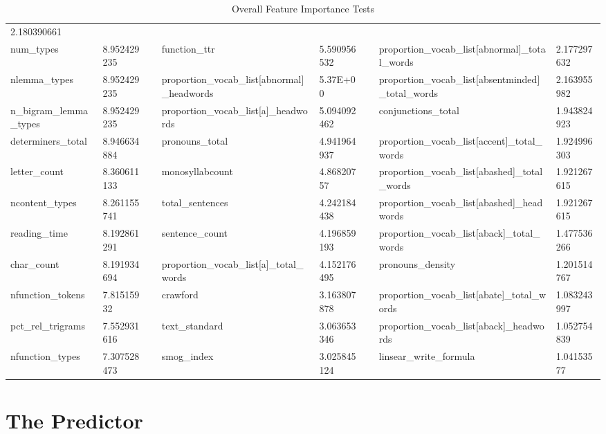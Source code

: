 \begin{table}[h]
{\begin{tabular}{@{}llllllll@{}}
  2.180390661 \\
num\_types &
  8.952429235 &
  &
  function\_ttr &
  5.590956532 &
  &
  proportion\_vocab\_list{[}abnormal{]}\_total\_words &
  2.177297632 \\
nlemma\_types &
  8.952429235 &
  &
  proportion\_vocab\_list{[}abnormal{]}\_headwords &
  5.37E+00 &
  &
  proportion\_vocab\_list{[}absentminded{]}\_total\_words &
  2.163955982 \\
n\_bigram\_lemma\_types &
  8.952429235 &
  &
  proportion\_vocab\_list{[}a{]}\_headwords &
  5.094092462 &
  &
  conjunctions\_total &
  1.943824923 \\
determiners\_total &
  8.946634884 &
  &
  pronouns\_total &
  4.941964937 &
  &
  proportion\_vocab\_list{[}accent{]}\_total\_words &
  1.924996303 \\
letter\_count &
  8.360611133 &
  &
  monosyllabcount &
  4.86820757 &
  &
  proportion\_vocab\_list{[}abashed{]}\_total\_words &
  1.921267615 \\
ncontent\_types &
  8.261155741 &
  &
  total\_sentences &
  4.242184438 &
  &
  proportion\_vocab\_list{[}abashed{]}\_headwords &
  1.921267615 \\
reading\_time &
  8.192861291 &
  &
  sentence\_count &
  4.196859193 &
  &
  proportion\_vocab\_list{[}aback{]}\_total\_words &
  1.477536266 \\
char\_count &
  8.191934694 &
  &
  proportion\_vocab\_list{[}a{]}\_total\_words &
  4.152176495 &
  &
  pronouns\_density &
  1.201514767 \\
nfunction\_tokens &
  7.81515932 &
  &
  crawford &
  3.163807878 &
  &
  proportion\_vocab\_list{[}abate{]}\_total\_words &
  1.083243997 \\
pct\_rel\_trigrams &
  7.552931616 &
  &
  text\_standard &
  3.063653346 &
  &
  proportion\_vocab\_list{[}aback{]}\_headwords &
  1.052754839 \\
nfunction\_types &
  7.307528473 &
  &
  smog\_index &
  3.025845124 &
  &
  linsear\_write\_formula &
  1.04153577 \\ \bottomrule
\end{tabular}%
}
\caption{Overall Feature Importance Tests}
\label{tab:e5}
\end{table}

\section{The Predictor}

